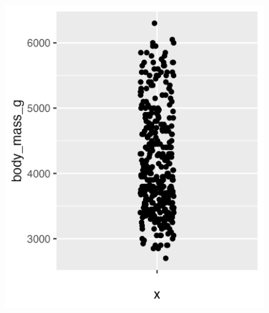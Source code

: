\documentclass[
  letterpaper,
  DIV=11,
  numbers=noendperiod]{scrreprt}
\begin{document}
\begin{figure}
\begin{minipage}[t]{0.33\linewidth}
{{\includegraphics{./03-visualization_files/figure-pdf/fig-jitter-2.png}

}

}

\end{minipage}%
%
\begin{minipage}[t]{0.33\linewidth}

{\centering 

\raisebox{-\height}{

}}
\end{minipage}
\end{figure}
\end{document}
